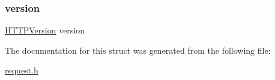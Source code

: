 \mbox{\label{structhttp__request__struct_ad3e7ead879a6e870226227ac79d73ec9}} 
\subsubsection{\texorpdfstring{version}{version}}
{\footnotesize\ttfamily \hyperlink{helpers_8h_abe818f5ff14e9c60c052a3e96877cec6}{H\+T\+T\+P\+Version} version}



The documentation for this struct was generated from the following file\+:\begin{DoxyCompactItemize}
\item 
\hyperlink{request_8h}{request.\+h}\end{DoxyCompactItemize}
